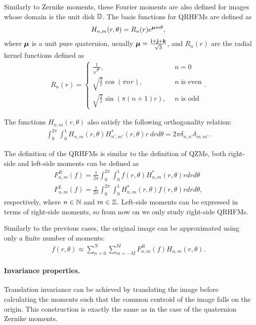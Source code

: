Similarly to Zernike moments, these Fourier moments are also defined for images whose domain is the unit disk $\mathbb{D}$. The basis functions for QRHFMs are defined as
\begin{gather*}
    H_{n,m}(r,\theta) = R_n(r)e^{\boldsymbol{\mu} m \theta},
\end{gather*}
where $\boldsymbol{\mu}$ is a unit pure quaternion, usually $\boldsymbol{\mu} = \frac{\mathbf{i} + \mathbf{j} + \mathbf{k}}{\sqrt{3}}$, and $R_n(r)$ are the radial kernel functions defined as
\begin{gather*}
    R_n(r) = \begin{cases}
        \frac{1}{\sqrt{r}}, &n = 0\\
        \sqrt{\frac{2}{r}}\cos(\pi n r), &n \text{ is even}\\
        \sqrt{\frac{2}{r}}\sin(\pi (n+1) r), \ \ &n \text{ is odd}
    \end{cases}.
\end{gather*}

The functions $H_{n,m}(r,\theta)$ also satisfy the following orthogonality relation:
\begin{gather*}
     \int_0^{2\pi} \int_0^1 H_{n,m}(r,\theta) H^*_{n',m'}(r,\theta) r \ dr d \theta = 2\pi\delta_{n,n'}\delta_{m,m'}.
\end{gather*}


The definition of the QRHFMs is similar to the definition of QZMs, both right-side and left-side moments can be defined as
\begin{gather*}
    F_{n,m}^R(f) = \frac{1}{2\pi}\int_0^{2\pi} \int_0^1 f(r,\theta)H_{n,m}^*(r,\theta) r dr d \theta \\
    F_{n,m}^L(f) = \frac{1}{2\pi}\int_0^{2\pi} \int_0^1 H_{n,m}^*(r,\theta)f(r,\theta) r dr d \theta,
\end{gather*} respectively, where $n \in \mathbb{N}$ and $m \in \mathbb{Z}$. Left-side moments can be expressed in terms of right-side moments, so from now on we only study right-side QRHFMs.


Similarly to the previous cases, the original image can be approximated using only a finite number of moments: 
\begin{gather*}
      f(r,\theta) \approx \sum_{n=0}^{N}\sum_{m=-M}^{M}F_{n,m}^R(f)H_{n,m}(r,\theta).
\end{gather*}

\paragraph{Invariance properties.}
Translation invariance can be achieved by translating the image before calculating the moments such that the common centroid of the image falls on the origin. This construction is exactly the same as in the case of the quaternion Zernike moments.


